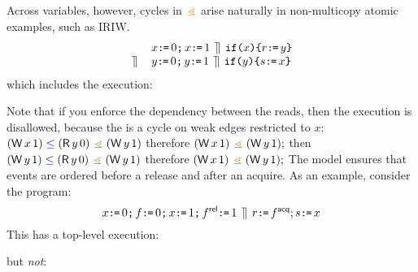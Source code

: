 Across variables, however, cycles in $\gtN$ arise naturally in non-multicopy
atomic examples, such as IRIW.
\[\begin{array}{rl}
  &x\texttt{:}\mkern-1mu\texttt{=}\,0\texttt{;}\, x\texttt{:}\mkern-1mu\texttt{=}\, 1
  \,\mathbin{\rrceil}\,
  \texttt{if}\allowbreak\texttt{(}x\texttt{)}\allowbreak\texttt{\{} r\texttt{:}\mkern-1mu\texttt{=}\, y \texttt{\}}
 \\{}
  \,\mathbin{\rrceil}\,&
  y\texttt{:}\mkern-1mu\texttt{=}\,0\texttt{;}\, y\texttt{:}\mkern-1mu\texttt{=}\, 1
  \,\mathbin{\rrceil}\,
  \texttt{if}\allowbreak\texttt{(}y\texttt{)}\allowbreak\texttt{\{} s\texttt{:}\mkern-1mu\texttt{=}\, x \texttt{\}}
\end{array}\]
which includes the execution:
\begin{tikzdisplay}[node distance=1em]
\end{tikzdisplay}
Note that if you enforce the dependency between the reads, then the execution
is disallowed, because the is a cycle on weak edges restricted to $x$:
\begin{math}
  (\DW{x}{1})\le (\DR{y}{0}) \gtN (\DW{y}{1})
\end{math}
therefore
\begin{math}
  (\DW{x}{1}) \gtN  (\DW{y}{1});
\end{math}
then
\begin{math}
  (\DW{y}{1})\le (\DR{y}{0}) \gtN (\DW{y}{1})
\end{math}
therefore
\begin{math}
  (\DW{x}{1}) \gtN  (\DW{y}{1});
\end{math}
The model ensures that events are ordered before a release and
after an acquire.
As an example, consider the program:
\[
  x\texttt{:}\mkern-1mu\texttt{=}\,0\texttt{;}\, f\texttt{:}\mkern-1mu\texttt{=}\,0\texttt{;}\, x\texttt{:}\mkern-1mu\texttt{=}\, 1\texttt{;}\, f ^{\mathsf{rel}}\texttt{:}\mkern-1mu\texttt{=}\,1 \,\mathbin{\rrceil}\, r\texttt{:}\mkern-1mu\texttt{=}\, f^{\mathsf{acq}}; s\texttt{:}\mkern-1mu\texttt{=}\, x
\]
This has a top-level execution:
\begin{tikzdisplay}[node distance=1em]
\end{tikzdisplay}
but \emph{not}:
\begin{tikzdisplay}[node distance=1em]
\end{tikzdisplay}
